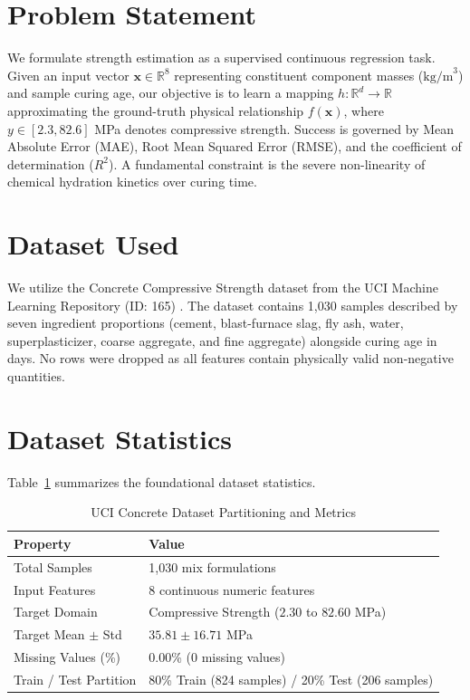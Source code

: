 \documentclass[10pt,journal,compsoc,twocolumn]{IEEEtran}
\begin{document}
\section{Problem Statement}
We formulate strength estimation as a supervised continuous regression task. Given an input vector $\mathbf{x} \in \mathbb{R}^8$ representing constituent component masses ($\text{kg/m}^3$) and sample curing age, our objective is to learn a mapping $h: \mathbb{R}^d \to \mathbb{R}$ approximating the ground-truth physical relationship $f(\mathbf{x})$, where $y \in [2.3, 82.6]$ MPa denotes compressive strength. Success is governed by Mean Absolute Error (MAE), Root Mean Squared Error (RMSE), and the coefficient of determination ($R^2$). A fundamental constraint is the severe non-linearity of chemical hydration kinetics over curing time.

\section{Dataset Used}
We utilize the Concrete Compressive Strength dataset from the UCI Machine Learning Repository (ID: 165) \cite{yeh1998modeling}. The dataset contains 1,030 samples described by seven ingredient proportions (cement, blast-furnace slag, fly ash, water, superplasticizer, coarse aggregate, and fine aggregate) alongside curing age in days. No rows were dropped as all features contain physically valid non-negative quantities.

\section{Dataset Statistics}
Table~\ref{tab:dataset_stats} summarizes the foundational dataset statistics.

\begin{table}[htbp]
\centering
\caption{UCI Concrete Dataset Partitioning and Metrics}
\label{tab:dataset_stats}
\begin{tabular}{ll}
\toprule
\textbf{Property} & \textbf{Value} \\
\midrule
Total Samples & 1,030 mix formulations \\
Input Features & 8 continuous numeric features \\
Target Domain & Compressive Strength ($2.30$ to $82.60$ MPa) \\
Target Mean $\pm$ Std & $35.81 \pm 16.71$ MPa \\
Missing Values (\%) & 0.00\% (0 missing values) \\
Train / Test Partition & 80\% Train (824 samples) / 20\% Test (206 samples) \\
\bottomrule
\end{tabular}
\end{table}
\end{document}
